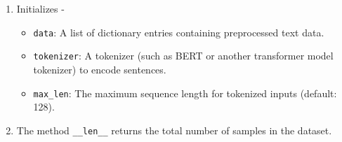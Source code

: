 \documentclass{article}
\begin{document}
\begin{enumerate}

\item Initializes - 
    \begin{itemize}
    \item \texttt{data}: A list of dictionary entries containing preprocessed text data.
    \item \texttt{tokenizer}: A tokenizer (such as BERT or another transformer model tokenizer) to encode sentences.
    \item \texttt{max\_len}: The maximum sequence length for tokenized inputs (default: 128).
\end{itemize}


\item The method \texttt{\_\_len\_\_} returns the total number of samples in the dataset.


\end{enumerate}
\end{document}
